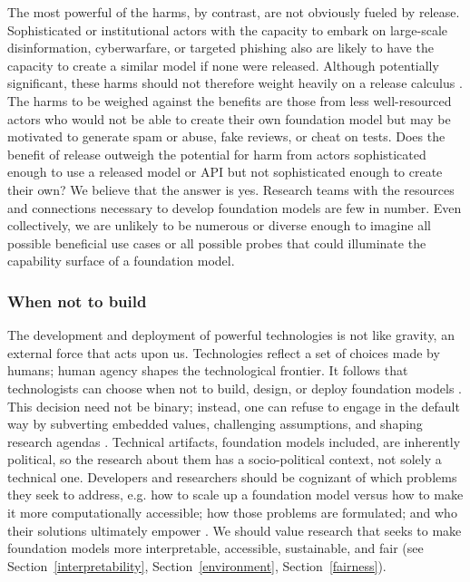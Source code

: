 The most powerful of the harms, by contrast, are not obviously fueled by release. Sophisticated or institutional actors with the capacity to embark on large-scale disinformation, cyberwarfare, or targeted phishing also are likely to have the capacity to create a similar model if none were released. Although potentially significant, these harms should not therefore weight heavily on a release calculus \citep{solaiman_release_2019, shevlane_offense-defense_2020}. The harms to be weighed against the benefits are those from less well-resourced actors who would not be able to create their own foundation model but may be motivated to generate spam or abuse, fake reviews, or cheat on tests. Does the benefit of release outweigh the potential for harm from actors sophisticated enough to use a released model or API but not sophisticated enough to create their own? We believe that the answer is yes. Research teams with the resources and connections necessary to develop foundation models are few in number.  Even collectively, we are unlikely to be numerous or diverse enough to imagine all possible beneficial use cases or all possible probes that could illuminate the capability surface of a foundation model.

\subsubsection{When not to build} 
\label{sec:ethics-nottobuild}

The development and deployment of powerful technologies is not like gravity, an external force that acts upon us. Technologies reflect a set of choices made by humans; human agency shapes the technological frontier. It follows that technologists can choose when not to build, design, or deploy foundation models \citep{zimmermann_stop_2021}. This decision need not be binary; instead, one can refuse to engage in the default way by subverting embedded values, challenging assumptions, and shaping research agendas \citep{audra_simpson}. Technical artifacts, foundation models included, are inherently political, so the research about them has a socio-political context, not solely a technical one. Developers and researchers should be cognizant of which problems they seek to address, e.g. how to scale up a foundation model versus how to make it more computationally accessible; how those problems are formulated; and who their solutions ultimately empower \citep{rogaway_moral_nodate, winner_artifacts_1980, Passi2019}. We should value research that seeks to make foundation models more interpretable, accessible, sustainable, and fair (see Section~\ref{interpretability}, Section~\ref{environment}, Section~\ref{fairness}). 

